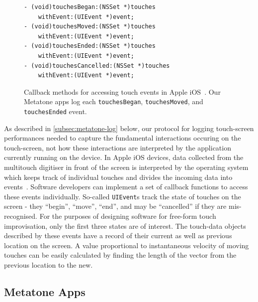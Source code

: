 \documentclass[graybox]{svmult}
\begin{document}
\begin{figure}
\begin{verbatim}
- (void)touchesBegan:(NSSet *)touches 
    withEvent:(UIEvent *)event;
- (void)touchesMoved:(NSSet *)touches 
    withEvent:(UIEvent *)event;
- (void)touchesEnded:(NSSet *)touches 
    withEvent:(UIEvent *)event;
- (void)touchesCancelled:(NSSet *)touches 
    withEvent:(UIEvent *)event;
\end{verbatim}
  \caption{Callback methods for accessing touch events in Apple
    iOS~\cite{AppleDeveloper:2015rm}. Our Metatone apps log each
    \texttt{touchesBegan}, \texttt{touchesMoved}, and
    \texttt{touchesEnded} event.}
\label{touch-event-code-listing}
\end{figure}


As described in \ref{subsec:metatone-log} below, our protocol for
logging touch-screen performances needed to capture the fundamental
interactions occuring on the touch-screen, not how these interactions
are interpreted by the application currently running on the device. In
Apple iOS devices, data collected from the multitouch digitiser in
front of the screen is interpreted by the operating system which keeps
track of individual touches and divides the incoming data into
events~\cite{AppleDeveloper:2015rm}. Software developers can implement
a set of callback functions to access these events individually.
So-called \texttt{UIEvent}s track the state of touches on the screen -
they ``begin'', ``move'', ``end'', and may be ``cancelled'' if they
are mis-recognised. For the purposes of designing software for
free-form touch improvisation, only the first three states are of
interest. The touch-data objects described by these events have a
record of their current as well as previous location on the screen. A
value proportional to instantaneous velocity of moving touches can be
easily calculated by finding the length of the vector from the
previous location to the new.

\subsection{Metatone Apps}
\label{subsec:metatone-apps}
\end{document}
